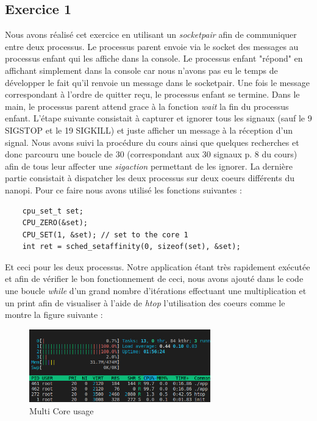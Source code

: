 \documentclass{ReportTemplate}
\begin{document}
\subsection{Exercice 1}
Nous avons réalisé cet exercice en utilisant un \textit{socketpair} afin de
communiquer entre deux processus. Le processus parent envoie via le socket des
messages au processus enfant qui les affiche dans la console. Le processus
enfant "répond" en affichant simplement dans la console car nous n'avons pas eu
le temps de développer le fait qu'il renvoie un message dans le socketpair. Une
fois le message correspondant à l'ordre de quitter reçu, le processus enfant se
termine. Dans le main, le processus parent attend grace à la fonction
\textit{wait} la fin du processus enfant.\newline
L'étape suivante consistait à capturer et ignorer tous les signaux (sauf le 9
SIGSTOP et le 19 SIGKILL) et juste afficher un message à la réception d'un
signal. Nous avons suivi la procédure du cours ainsi que quelques recherches et
donc parcouru une boucle de 30 (correspondant aux 30 signaux p. 8 du cours) afin
de tous leur affecter une \textit{sigaction} permettant de les ignorer.\newline
La dernière partie consistait à dispatcher les deux processus sur deux coeurs
différents du nanopi. Pour ce faire nous avons utilisé les fonctions suivantes :
\begin{verbatim}
    cpu_set_t set;
    CPU_ZERO(&set);
    CPU_SET(1, &set); // set to the core 1
    int ret = sched_setaffinity(0, sizeof(set), &set);
\end{verbatim}
Et ceci pour les deux processus. Notre application étant très rapidement
exécutée et afin de vérifier le bon fonctionnement de ceci, nous avons ajouté
dans le code une boucle \textit{while} d'un grand nombre d'itérations effectuant
une multiplication et un print afin de visualiser à l'aide de \textit{htop}
l'utilisation des coeurs comme le montre la figure suivante :
\begin{figure}[H]
    \centering
    \includegraphics[width=0.7\textwidth]{imageSources/MultiCPU.png.png}
    \caption{Multi Core usage}
    \label{fig:MultiCore}
\end{figure}
\newpage
\end{document}
